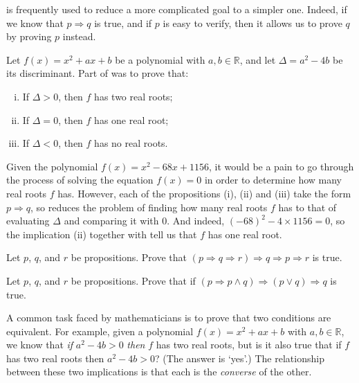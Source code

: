  is frequently used to reduce a more complicated goal to a simpler one. Indeed, if we know that $p \Rightarrow q$ is true, and if $p$ is easy to verify, then it allows us to prove $q$ by proving $p$ instead.

\begin{example}
Let $f(x) = x^2+ax+b$ be a polynomial with $a,b \in \mathbb{R}$, and let $\Delta = a^2-4b$ be its discriminant. Part of  was to prove that:
\begin{enumerate}[(i)]
\item If $\Delta > 0$, then $f$ has two real roots;
\item If $\Delta = 0$, then $f$ has one real root;
\item If $\Delta < 0$, then $f$ has no real roots.
\end{enumerate}
Given the polynomial $f(x) = x^2-68x+1156$, it would be a pain to go through the process of solving the equation $f(x)=0$ in order to determine how many real roots $f$ has. However, each of the propositions (i), (ii) and (iii) take the form $p \Rightarrow q$, so  reduces the problem of finding how many real roots $f$ has to that of evaluating $\Delta$ and comparing it with $0$. And indeed, $(-68)^2 - 4 \times 1156 = 0$, so the implication (ii) together with \elimrule{\Rightarrow} tell us that $f$ has one real root.
\end{example}

\begin{exercise}
Let $p$, $q$, and $r$ be propositions. Prove that $(p \Rightarrow q \Rightarrow r) \Rightarrow q \Rightarrow p \Rightarrow r$ is true.
\end{exercise}

\begin{exercise}
Let $p$, $q$, and $r$ be propositions. Prove that if $(p \Rightarrow p \wedge q) \Rightarrow (p \vee q) \Rightarrow q$ is true.
\end{exercise}


A common task faced by mathematicians is to prove that two conditions are equivalent. For example, given a polynomial $f(x) = x^2+ax+b$ with $a,b \in \mathbb{R}$, we know that \textit{if} $a^2-4b>0$ \textit{then} $f$ has two real roots, but is it also true that if $f$ has two real roots then $a^2-4b>0$? (The answer is `yes'.) The relationship between these two implications is that each is the \textit{converse} of the other.

